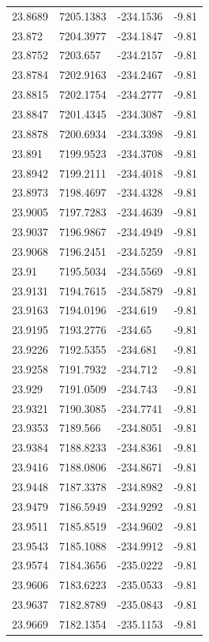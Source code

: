 \begin{table}[H]
\begin{tabular}{llll}
23.8689 & 7205.1383 & -234.1536 & -9.81 \\
23.872 & 7204.3977 & -234.1847 & -9.81 \\
23.8752 & 7203.657 & -234.2157 & -9.81 \\
23.8784 & 7202.9163 & -234.2467 & -9.81 \\
23.8815 & 7202.1754 & -234.2777 & -9.81 \\
23.8847 & 7201.4345 & -234.3087 & -9.81 \\
23.8878 & 7200.6934 & -234.3398 & -9.81 \\
23.891 & 7199.9523 & -234.3708 & -9.81 \\
23.8942 & 7199.2111 & -234.4018 & -9.81 \\
23.8973 & 7198.4697 & -234.4328 & -9.81 \\
23.9005 & 7197.7283 & -234.4639 & -9.81 \\
23.9037 & 7196.9867 & -234.4949 & -9.81 \\
23.9068 & 7196.2451 & -234.5259 & -9.81 \\
23.91 & 7195.5034 & -234.5569 & -9.81 \\
23.9131 & 7194.7615 & -234.5879 & -9.81 \\
23.9163 & 7194.0196 & -234.619 & -9.81 \\
23.9195 & 7193.2776 & -234.65 & -9.81 \\
23.9226 & 7192.5355 & -234.681 & -9.81 \\
23.9258 & 7191.7932 & -234.712 & -9.81 \\
23.929 & 7191.0509 & -234.743 & -9.81 \\
23.9321 & 7190.3085 & -234.7741 & -9.81 \\
23.9353 & 7189.566 & -234.8051 & -9.81 \\
23.9384 & 7188.8233 & -234.8361 & -9.81 \\
23.9416 & 7188.0806 & -234.8671 & -9.81 \\
23.9448 & 7187.3378 & -234.8982 & -9.81 \\
23.9479 & 7186.5949 & -234.9292 & -9.81 \\
23.9511 & 7185.8519 & -234.9602 & -9.81 \\
23.9543 & 7185.1088 & -234.9912 & -9.81 \\
23.9574 & 7184.3656 & -235.0222 & -9.81 \\
23.9606 & 7183.6223 & -235.0533 & -9.81 \\
23.9637 & 7182.8789 & -235.0843 & -9.81 \\
23.9669 & 7182.1354 & -235.1153 & -9.81 \\

\end{tabular}
\end{table}
